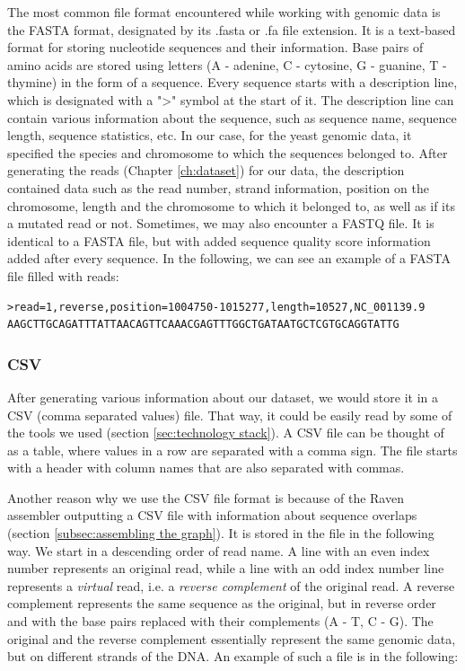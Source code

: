 \documentclass[times, utf8, diplomski, english]{fer_eng}
\begin{document}
The most common file format encountered while working with genomic data is the FASTA format, designated by its .fasta or .fa file extension. It is a text-based format for storing nucleotide sequences and their information. Base pairs of amino acids are stored using letters (A - adenine, C - cytosine, G - guanine, T - thymine) in the form of a sequence. Every sequence starts with a description line, which is designated with a ">" symbol at the start of it. The description line can contain various information about the sequence, such as sequence name, sequence length, sequence statistics, etc. In our case, for the yeast genomic data, it specified the species and chromosome to which the sequences belonged to. After generating the reads (Chapter \ref{ch:dataset}) for our data, the description contained data such as the read number, strand information, position on the chromosome, length and the chromosome to which it belonged to, as well as if its a mutated read or not. Sometimes, we may also encounter a FASTQ file. It is identical to a FASTA file, but with added sequence quality score information added after every sequence. In the following, we can see an example of a FASTA file filled with reads:

\begin{lstlisting}
>read=1,reverse,position=1004750-1015277,length=10527,NC_001139.9
AAGCTTGCAGATTTATTAACAGTTCAAACGAGTTTGGCTGATAATGCTCGTGCAGGTATTG
\end{lstlisting}

\subsubsection{CSV}
\label{subsubsec:csv}

After generating various information about our dataset, we would store it in a CSV (comma separated values) file. That way, it could be easily read by some of the tools we used (section \ref{sec:technology stack}). A CSV file can be thought of as a table, where values in a row are separated with a comma sign. The file starts with a header with column names that are also separated with commas.

Another reason why we use the CSV file format is because of the Raven assembler outputting a CSV file with information about sequence overlaps (section \ref{subsec:assembling the graph}). It is stored in the file in the following way. We start in a descending order of read name. A line with an even index number represents an original read, while a line with an odd index number line represents a \textit{virtual} read, i.e. a \textit{reverse complement} of the original read. A reverse complement represents the same sequence as the original, but in reverse order and with the base pairs replaced with their complements (A - T, C - G). The original and the reverse complement essentially represent the same genomic data, but on different strands of the DNA. An example of such a file is in the following:
\end{document}
